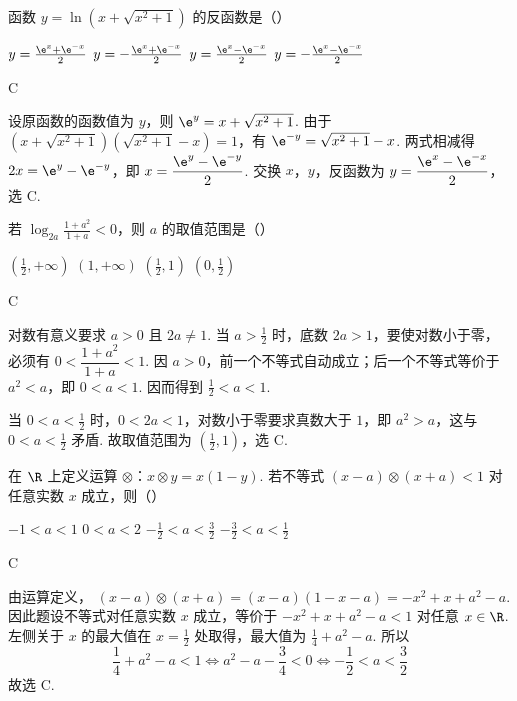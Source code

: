 \begin{problem}
函数 \(y = \ln \left(x + \sqrt{x^2 + 1}\right)\) 的反函数是（\quad）

\choices
    {\(y = \frac{\e^x + \e^{-x}}{2}\)}
    {\(y = -\frac{\e^x + \e^{-x}}{2}\)}
    {\(y = \frac{\e^x - \e^{-x}}{2}\)}
    {\(y = -\frac{\e^x - \e^{-x}}{2}\)}

\begin{answer}
C
\end{answer}

\begin{solution}
设原函数的函数值为 \(y\)，则 \(\e^y=x+\sqrt{x^2+1}\). 由于 \((x+\sqrt{x^2+1})(\sqrt{x^2+1}-x)=1\)，有 \(\e^{-y}=\sqrt{x^2+1}-x\).
两式相减得 \(2x=\e^y-\e^{-y}\)，即 \(x=\dfrac{\e^y-\e^{-y}}2\). 交换 \(x\)，\(y\)，反函数为 \(y=\dfrac{\e^x-\e^{-x}}2\)，选 C.
\end{solution}
\end{problem}

\begin{problem}
若 \(\log_{2a}\frac{1 + a^2}{1 + a} < 0\)，则 \(a\) 的取值范围是（\quad）

\choices
    {\(\left(\frac{1}{2}, +\infty\right)\)}
    {\((1, +\infty)\)}
    {\(\left(\frac{1}{2}, 1\right)\)}
    {\(\left(0, \frac{1}{2}\right)\)}

\begin{answer}
C
\end{answer}

\begin{solution}
对数有意义要求 \(a>0\) 且 \(2a\ne1\). 当 \(a>\frac12\) 时，底数 \(2a>1\)，要使对数小于零，必须有 \(0<\dfrac{1+a^2}{1+a}<1\).
因 \(a>0\)，前一个不等式自动成立；后一个不等式等价于 \(a^2<a\)，即 \(0<a<1\). 因而得到 \(\frac12<a<1\).

当 \(0<a<\frac12\) 时，\(0<2a<1\)，对数小于零要求真数大于 \(1\)，即 \(a^2>a\)，这与 \(0<a<\frac12\) 矛盾. 故取值范围为 \(\left(\frac12,1\right)\)，选 C.
\end{solution}
\end{problem}

\begin{problem}
在 \(\R\) 上定义运算 \(\otimes\)：\(x \otimes y = x(1 - y)\). 若不等式 \((x - a) \otimes (x + a) < 1\) 对任意实数 \(x\) 成立，则（\quad）

\choices
    {\(-1 < a < 1\)}
    {\(0 < a < 2\)}
    {\(-\frac{1}{2} < a < \frac{3}{2}\)}
    {\(-\frac{3}{2} < a < \frac{1}{2}\)}

\begin{answer}
C
\end{answer}

\begin{solution}
由运算定义，
\((x-a)\otimes(x+a)=(x-a)(1-x-a)=-x^2+x+a^2-a\).
因此题设不等式对任意实数 \(x\) 成立，等价于
\(-x^2+x+a^2-a<1\) 对任意 \(x\in\R\).
左侧关于 \(x\) 的最大值在 \(x=\frac12\) 处取得，最大值为 \(\frac14+a^2-a\). 所以
\[
\frac14+a^2-a<1
\Longleftrightarrow
a^2-a-\frac34<0
\Longleftrightarrow
-\frac12<a<\frac32
\]
故选 C.
\end{solution}
\end{problem}

